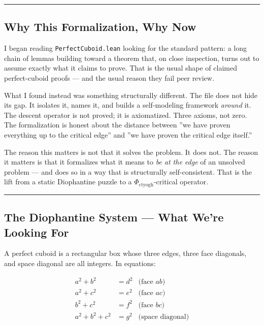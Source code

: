 \documentclass[12pt,a4paper]{article}
\begin{document}
\begin{center}
\rule{0.5\textwidth}{0.4pt}
\end{center}

\subsection{Why This Formalization, Why Now}

I began reading \texttt{PerfectCuboid.lean} looking for the standard pattern: a long chain of lemmas building toward a theorem that, on close inspection, turns out to assume exactly what it claims to prove. That is the usual shape of claimed perfect-cuboid proofs --- and the usual reason they fail peer review.

What I found instead was something structurally different. The file does not hide its gap. It isolates it, names it, and builds a self-modeling framework \emph{around} it. The descent operator is not proved; it is axiomatized. Three axioms, not zero. The formalization is honest about the distance between ''we have proven everything up to the critical edge'' and ''we have proven the critical edge itself.''

The reason this matters is not that it solves the problem. It does not. The reason it matters is that it formalizes what it means to \emph{be at the edge} of an unsolved problem --- and does so in a way that is structurally self-consistent. That is the lift from a static Diophantine puzzle to a $\Phi_{\text{ctyogh}}$-critical operator.

\begin{center}
\rule{0.5\textwidth}{0.4pt}
\end{center}

\subsection{The Diophantine System --- What We're Looking For}

A perfect cuboid is a rectangular box whose three edges, three face diagonals, and space diagonal are all integers. In equations:

\[\begin{aligned}
a^2 + b^2 &= d^2 & \text{(face } ab\text{)} \\
a^2 + c^2 &= e^2 & \text{(face } ac\text{)} \\
b^2 + c^2 &= f^2 & \text{(face } bc\text{)} \\
a^2 + b^2 + c^2 &= g^2 & \text{(space diagonal)}
\end{aligned}\]
\end{document}
